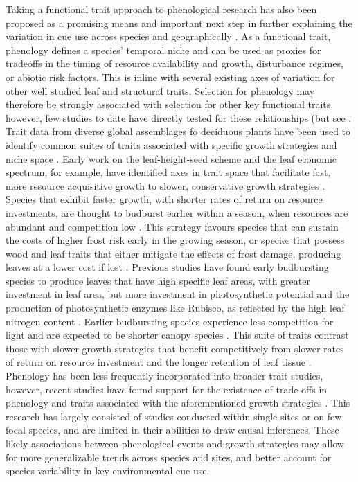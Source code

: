 \documentclass{article}\usepackage[]{graphicx}\usepackage[]{color}
\begin{document}
Taking a functional trait approach to phenological research has also been proposed as a promising means and important next step in further explaining the variation in cue use across species and geographically \citep{Flynn2018, Osada2018}. As a functional trait, phenology defines a species' temporal niche and can be used as proxies for tradeoffs in the timing of resource availability and growth, disturbance regimes, or abiotic risk factors. This is inline with several existing axes of variation for other well studied leaf and structural traits. Selection for phenology may therefore be strongly associated with selection for other key functional traits, however, few studies to date have directly tested for these relationships (but see \citep{Osada2018, Sun 2006, Lechowicz1984}. Trait data from diverse global assemblages fo deciduous plants have been used to identify common suites of traits associated with specific growth strategies and niche space \citep{Westoby1998, Wright2004, Chave2009}. Early work on the leaf-height-seed scheme and the leaf economic spectrum, for example, have identified axes in trait space that facilitate fast, more resource acquisitive growth to slower, conservative growth strategies \citep{Westoby1998, Wright2004, Diaz2016, Chave2009, Funk2016}. Species that exhibit faster growth, with shorter rates of return on resource investments, are thought to budburst earlier within a season, when resources are abundant and competition low \citep{citation}. This strategy favours species that can sustain the costs of higher frost risk early in the growing season, or species that possess wood and leaf traits that either mitigate the effects of frost damage, producing leaves at a lower cost if lost \citep{Lechowicz1984, Lenz2013}. Previous studies have found early budbursting species to produce leaves that have high specific leaf areas, with greater investment in leaf area, but more investment in photosynthetic potential and the production of photosynthetic enzymes like Rubisco, as reflected by the high leaf nitrogen content \citep{citation}. Earlier budbursting species experience less competition for light and are expected to be shorter canopy species \citep{citation}. This suite of traits contrast those with slower growth strategies that benefit competitively from slower rates of return on resource investment and the longer retention of leaf tissue \citep{citation}. Phenology has been less frequently incorporated into broader trait studies, however, recent studies have found support for the existence of trade-offs in phenology and traits associated with the aforementioned growth strategies \citep{citations from Kelly's review}. This research has largely consisted of studies conducted within single sites or on few focal species, and are limited in their abilities to draw causal inferences. These likely associations between phenological events and growth strategies may allow for more generalizable trends across species and sites, and better account for species variability in key environmental cue use. 
 
\end{document}

